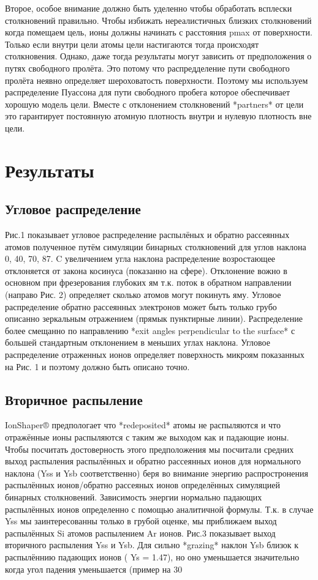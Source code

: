 \documentclass[a4paper,fontsize=12pt]{article}
\begin{document}
Второе, особое внимание должно быть уделенно чтобы обработать всплески столкновений правильно. Чтобы избижать нереалистичных близких столкновений когда помещаем цель, ионы должны начинать с расстояния pmax от поверхности. Только если внутри цели атомы цели настигаются тогда происходят столкновения. Однако, даже тогда результаты могут зависить от предположения о путях свободного пролёта. Это потому что распредделение пути свободного пролёта неявно определяет шероховатость поверхности. Поэтому мы используем распределение Пуассона для пути свободного пробега которое обеспечивает хорошую модель цели. Вместе с отклонением столкновений *partners* от цели это гарантирует постоянную атомную плотность внутри и нулевую плотность вне цели.

\section{Результаты}
\subsection{Угловое распределение}

Рис.1 показывает угловое распределение распылёных и обратно рассеянных атомов полученное путём симуляции бинарных столкновений для углов наклона 0, 40, 70, 87.
C увеличением угла наклона распределение возростающее отклоняется от закона косинуса (показанно на сфере). Отклонение вожно в основном при фрезерования глубоких ям т.к. поток в обратном направлении (направо Рис. 2) определяет сколько атомов могут покинуть яму.
Угловое распределение обратно рассеянных электронов может быть только грубо описанно зеркальным отражением (прямык пунктирные линии). Распределение более смещанно по направлению *exit angles perpendicular to the surface* с большей стандартным отклонением в меньших углах наклона. Угловое распределение отраженных ионов определяет поверхность микроям показанных на Рис. 1 и поэтому должно быть описано точно.

\subsection{Вторичное распыление}
IonShaper® предпологает что *redeposited* атомы не распыляются и что отражённые ионы распыляются с таким же выходом как и падающие ионы. Чтобы посчитать достоверность этого предположения мы посчитали средних выход распыления распылённых  и обратно рассеянных ионов для нормального наклона (Yss и Ysb соответственно) беря во внимание энергию распростронения распылённых ионов/обратно рассеяных ионов определённых симуляцией бинарных столкновений. Зависимость энергии нормально падающих распылённых ионов определенно с помощью аналитичной формулы. Т.к. в случае Yss мы заинтересованны только в грубой оценке, мы приближаем выход распылённых Si атомов распылением Ar ионов.
Рис.3 показывает выход вторичного распыления Yss и Ysb. Для сильно *grazing* наклон Ysb близок к распылённию падающих ионов ( Ys = 1.47), но оно уменьшается значительно когда угол падения уменьшается (пример на 30%
\end{document}

